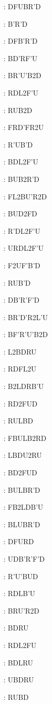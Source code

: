 \documentclass[9pt]{article}
\begin{document}
{\begin{multicols}{6}
: DFUBR'D

: B'R'D

: DFB'R'D

: BD'RF'U

: BR'U'B2D

: RDL2F'U

: RUB2D

: FRD'FR2U

: R'UB'D

: BDL2F'U

: BUB2R'D

: FL2BU'R2D

: BUD2FD

: R'DL2F'U

: URDL2F'U

: F2UF'B'D

: RUB'D

: DB'R'F'D

: BR'D'R2L'U

: BF'R'U'B2D

: L2BDRU

: RDFL2U

: B2LDRB'U

: RD2FUD

: RULBD

: FBULB2RD

: LBDU2RU

: BD2FUD

: BULBR'D

: FB2LDB'U

: BLUBR'D

: DFURD

: UDB'R'F'D

: R'U'BUD

: RDLB'U

: BRU'R2D

: BDRU

: RDL2FU

: BDLRU

: UBDRU

: RUBD


\end{multicols}}
\end{document}
